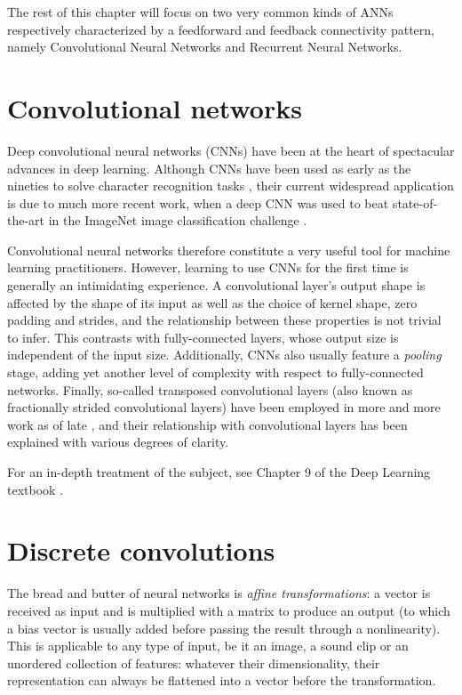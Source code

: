 The rest of this chapter will focus on two very common kinds of ANNs
respectively characterized by a feedforward and feedback connectivity pattern,
namely Convolutional Neural Networks and Recurrent Neural Networks.


\section{Convolutional networks}\label{sec:convnets}

Deep convolutional neural networks (CNNs) have been at the heart of spectacular
advances in deep learning. Although CNNs have been used as early as the nineties
to solve character recognition tasks \citep{le1997reading}, their current
widespread application is due to much more recent work, when a deep CNN was used
to beat state-of-the-art in the ImageNet image classification challenge
\citep{krizhevsky2012imagenet}.

Convolutional neural networks therefore constitute a very useful tool for
machine learning practitioners.
However, learning to use CNNs for the first time
is generally an intimidating experience. A convolutional layer's output shape is
affected by the shape of its input as well as the choice of kernel shape, zero
padding and strides, and the relationship between these properties is not
trivial to infer. This contrasts with fully-connected layers, whose output size
is independent of the input size. Additionally, CNNs also usually feature a {\em
pooling\/} stage, adding yet another level of complexity with respect to
fully-connected networks.  Finally, so-called transposed convolutional layers
(also known as fractionally strided convolutional layers) have been employed in
more and more work as of late \citep{zeiler2011adaptive,zeiler2014visualizing,
long2015fully,radford2015unsupervised,visin15,im2016generating}, and their
relationship with convolutional layers has been explained with various degrees
of clarity.

For an in-depth treatment of the subject, see Chapter 9 of the Deep Learning
textbook \citep{Goodfellow-et-al-2016-Book}.

\section{Discrete convolutions}

The bread and butter of neural networks is \emph{affine transformations}: a
vector is received as input and is multiplied with a matrix to produce an
output (to which a bias vector is usually added before passing the result
through a nonlinearity). This is applicable to any type of input, be it an
image, a sound clip or an unordered collection of features: whatever their
dimensionality, their representation can always be flattened into a vector
before the transformation.


